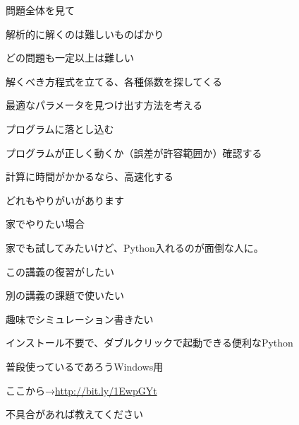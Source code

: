 \documentclass[dvipdfmx]{beamer}
\newenvironment{wideitemize}{\itemize\setlength{\itemsep}{1em}}{\enditemize}
\newenvironment{wideitemize2}{\itemize\setlength{\itemsep}{0.2em}}{\enditemize}
\begin{document}

\begin{frame}{問題全体を見て}
\begin{wideitemize}
\item 解析的に解くのは難しいものばかり
\item どの問題も一定以上は難しい
\begin{wideitemize2}
	\item 解くべき方程式を立てる、各種係数を探してくる
	\item 最適なパラメータを見つけ出す方法を考える
	\item プログラムに落とし込む
	\item プログラムが正しく動くか（誤差が許容範囲か）確認する
	\item 計算に時間がかかるなら、高速化する
\end{wideitemize2}
\item どれもやりがいがあります
\end{wideitemize}
\end{frame}

\begin{frame}{家でやりたい場合}
\begin{wideitemize}
\item 家でも試してみたいけど、Python入れるのが面倒な人に。
\begin{wideitemize2}
	\item この講義の復習がしたい
	\item 別の講義の課題で使いたい
	\item 趣味でシミュレーション書きたい
\end{wideitemize2}
\item インストール不要で、ダブルクリックで起動できる便利なPython
\item 普段使っているであろうWindows用
\item ここから→\url{http://bit.ly/1EwpGYt}
\begin{wideitemize2}
	\item 不具合があれば教えてください
\end{wideitemize2}
\end{wideitemize}
\end{frame}
\end{document}
